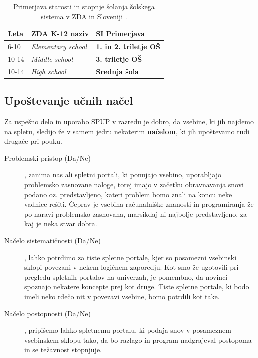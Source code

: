 \begin{table}[!h]
\caption{Primerjava starosti in stopnje šolanja šolskega sistema v ZDA
  in Sloveniji \cite{wiki:k12}.}
\label{tab:primerjava_šolski}
\begin{tabular}{
  | p{} |
  p{} |
  p{} |  }
\hline
  \rowcolor{sbase01!100}
  \textbf{Leta} & \textbf{ZDA K-12 naziv} & \textbf{SI Primerjava} \\
        \hline
      6-10    & \emph{Elementary school} & \textbf{1. in 2. triletje
                                             OŠ}\\
        \hline
      10-14    & \emph{Middle school} & \textbf{3. triletje OŠ} \\
        \hline
  10-14    & \emph{High school} & \textbf{Srednja šola} \\
  \hline
\end{tabular}
\end{table}

\subsection{Upoštevanje učnih načel}
\label{sec:upoštevanje_načel}

Za uspešno delo in uporabo SPUP v razredu je dobro, da vsebine, ki jih
najdemo na spletu, sledijo že v samem jedru nekaterim \textbf{načelom}, ki jih
upoštevamo tudi drugače pri pouku.

\begin{description}
\item[Problemski pristop (Da/Ne)], zanima nas ali spletni portali, ki
  ponujajo vsebino, uporabljajo problemsko zasnovane naloge, torej imajo
  v začetku obravnavanja snovi podano oz. predstavljeno, kateri problem
  bomo znali na koncu neke vadnice rešiti. Čeprav je vsebina
  računalniške znanosti in programiranja že po naravi problemsko
  zasnovana, marsikdaj ni najbolje predstavljeno, za kaj je neka stvar
  dobra.
\item[Načelo sistematičnosti (Da/Ne)], lahko potrdimo za tiste
  spletne portale, kjer so posamezni vsebinski sklopi povezani v nekem
  logičnem zaporedju. Kot smo že ugotovili pri pregledu spletnih
  portalov na univerzah, je pomembno, da novinci spoznajo nekatere
  koncepte prej kot druge. Tiste spletne portale, ki bodo imeli neko
  rdečo nit v povezavi vsebine, bomo potrdili kot take.
\item[Načelo postopnosti (Da/Ne)], pripišemo lahko spletnemu portalu,
  ki podaja snov v posameznem vsebinskem sklopu tako, da bo razlago
  in program nadgrajeval postopoma in se težavnost stopnjuje.
\end{description}

